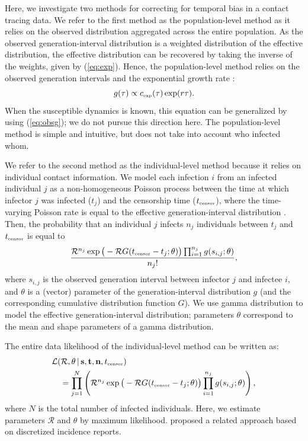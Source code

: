\documentclass[12pt]{article}
\newcommand{\eref}[1]{(\ref{eq:#1})}
\newcommand{\RR}{\ensuremath{{\mathcal R}}}
\newcommand{\tsub}[2]{#1_{{\textrm{\tiny #2}}}}
\begin{document}
Here, we investigate two methods for correcting for temporal bias in a contact tracing data.
We refer to the first method as the population-level method as it relies on the observed distribution aggregated across the entire population.
As the observed generation-interval distribution is a weighted distribution of the effective distribution, the effective distribution can be recovered by taking the inverse of the weights, given by \eref{exp}.
Hence, the population-level method relies on the observed generation intervals and the exponential growth rate \citep{tomba2010some, nishiura2010time, britton2019estimation}:
\begin{equation}
g(\tau) \propto \tsub{c}{exp}(\tau) \exp(r\tau).
\end{equation}
When the susceptible dynamics is known, this equation can be generalized by using \eref{obsg}; we do not pursue this direction here.
The population-level method is simple and intuitive, but does not take into account who infected whom.

We refer to the second method as the individual-level method because it relies on individual contact information.
We model each infection $i$ from an infected individual $j$ as a non-homogeneous Poisson process between the time at which infector $j$ was infected ($t_j$) and the censorship time ($\tsub{t}{censor}$), where the time-varying Poisson rate is equal to the effective generation-interval distribution \citep{daley2007introduction}.
Then, the probability that an individual $j$ infects $n_j$ individuals between $t_j$ and $\tsub{t}{censor}$ is equal to
\begin{equation}
\frac{\RR^{n_j} \exp \big(- \RR G(\tsub{t}{censor} - t_j ;\theta) \big) \prod_{i=1}^{n_j} g(s_{i, j}; \theta)}{n_j!},
\end{equation}
where $s_{i,j}$ is the observed generation interval between infector $j$ and infectee $i$, and $\theta$ is a (vector) parameter of the generation-interval distribution $g$ (and the corresponding cumulative distribution function $G$).
We use gamma distribution to model the effective generation-interval distribution;
parameters $\theta$ correspond to the mean and shape parameters of a gamma distribution.

The entire data likelihood of the individual-level method can be written as:
\begin{equation}
\begin{aligned}
&\mathcal{L}(\RR, \theta\,|\, \mathbf{s}, \mathbf{t}, \mathbf{n}, \tsub{t}{censor})\\
&\quad=\prod_{j=1}^N \left(\RR^{n_j} \exp \big(- \RR G(\tsub{t}{censor} - t_j ;\theta) \big) \prod_{i=1}^{n_j} g(s_{i, j}; \theta) \right),
\end{aligned}
\end{equation}
where $N$ is the total number of infected individuals.
Here, we estimate parameters $\RR$ and $\theta$ by maximum likelihood.
\cite{forsberg2008likelihood} proposed a related approach based on discretized incidence reports.
\end{document}
